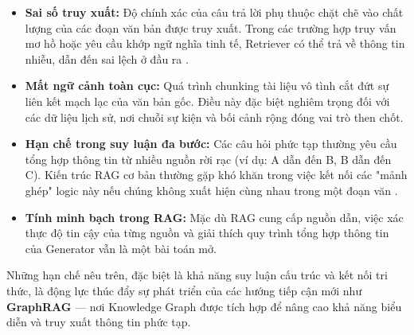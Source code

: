 \begin{itemize}
    \item \textbf{Sai số truy xuất:} Độ chính xác của câu trả lời phụ thuộc chặt chẽ vào chất lượng của các đoạn văn bản được truy xuất. Trong các trường hợp truy vấn mơ hồ hoặc yêu cầu khớp ngữ nghĩa tinh tế, Retriever có thể trả về thông tin nhiễu, dẫn đến sai lệch ở đầu ra \cite{karpukhin2020dpr}.
    
    \item \textbf{Mất ngữ cảnh toàn cục:} Quá trình chunking tài liệu vô tình cắt đứt sự liên kết mạch lạc của văn bản gốc. Điều này đặc biệt nghiêm trọng đối với các dữ liệu lịch sử, nơi chuỗi sự kiện và bối cảnh rộng đóng vai trò then chốt.
    
    \item \textbf{Hạn chế trong suy luận đa bước:} Các câu hỏi phức tạp thường yêu cầu tổng hợp thông tin từ nhiều nguồn rời rạc (ví dụ: A dẫn đến B, B dẫn đến C). Kiến trúc RAG cơ bản thường gặp khó khăn trong việc kết nối các "mảnh ghép" logic này nếu chúng không xuất hiện cùng nhau trong một đoạn văn \cite{izacard2021fid}.
    
    \item \textbf{Tính minh bạch trong RAG:} Mặc dù RAG cung cấp nguồn dẫn, việc xác thực độ tin cậy của từng nguồn và giải thích quy trình tổng hợp thông tin của Generator vẫn là một bài toán mở.
\end{itemize}

Những hạn chế nêu trên, đặc biệt là khả năng suy luận cấu trúc và kết nối tri thức, là động lực thúc đẩy sự phát triển của các hướng tiếp cận mới như \textbf{GraphRAG} — nơi Knowledge Graph được tích hợp để nâng cao khả năng biểu diễn và truy xuất thông tin phức tạp.
